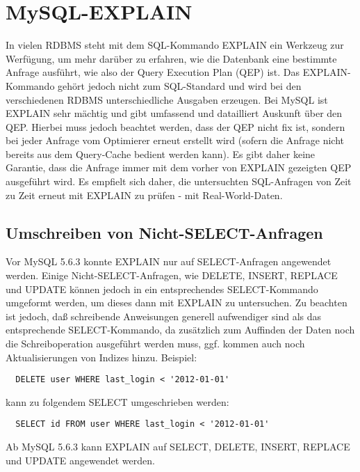 \section{MySQL-EXPLAIN}
In vielen RDBMS steht mit dem SQL-Kommando EXPLAIN ein Werkzeug zur Werfügung, um mehr darüber zu erfahren, wie die Datenbank eine bestimmte Anfrage ausführt, wie also der Query Execution Plan (QEP) ist. Das EXPLAIN-Kommando gehört jedoch nicht zum SQL-Standard und wird bei den verschiedenen RDBMS unterschiedliche Ausgaben erzeugen. Bei MySQL ist EXPLAIN sehr mächtig und gibt umfassend und datailliert Auskunft über den QEP. Hierbei muss jedoch beachtet werden, dass der QEP nicht fix ist, sondern bei jeder Anfrage vom Optimierer erneut erstellt wird (sofern die Anfrage nicht bereits aus dem Query-Cache bedient werden kann). Es gibt daher keine Garantie, dass die Anfrage immer mit dem vorher von EXPLAIN gezeigten QEP ausgeführt wird. Es empfielt sich daher, die untersuchten SQL-Anfragen von Zeit zu Zeit erneut mit EXPLAIN zu prüfen - mit Real-World-Daten.

\subsection{Umschreiben von Nicht-SELECT-Anfragen}
Vor MySQL 5.6.3 konnte EXPLAIN nur auf SELECT-Anfragen angewendet werden. \cite{refman1}
Einige Nicht-SELECT-Anfragen, wie DELETE, INSERT, REPLACE und UPDATE können jedoch in ein entsprechendes SELECT-Kommando umgeformt werden, um dieses dann mit EXPLAIN zu untersuchen. Zu beachten ist jedoch, daß schreibende Anweisungen generell aufwendiger sind als das entsprechende SELECT-Kommando, da zusätzlich zum Auffinden der Daten noch die Schreiboperation ausgeführt werden muss, ggf. kommen auch noch Aktualisierungen von Indizes hinzu.
Beispiel:
\begin{lstlisting}
  DELETE user WHERE last_login < '2012-01-01'
\end{lstlisting}
kann zu folgendem SELECT umgeschrieben werden:
\begin{lstlisting}
  SELECT id FROM user WHERE last_login < '2012-01-01'
\end{lstlisting}
Ab MySQL 5.6.3 kann EXPLAIN auf SELECT, DELETE, INSERT, REPLACE und UPDATE angewendet werden.

